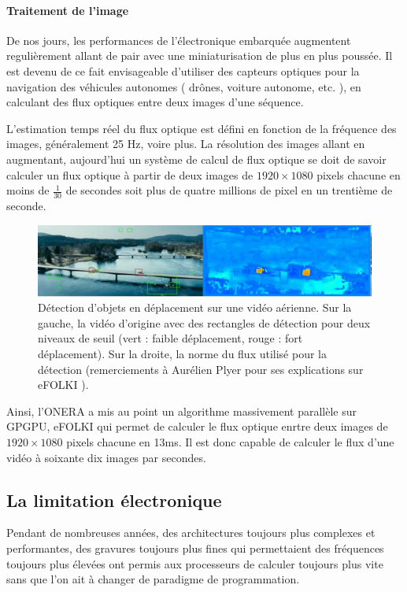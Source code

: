 \documentclass[fleqn,11pt]{article}
\begin{document}
\paragraph{Traitement de l'image}

De nos jours, les performances de l'électronique embarquée augmentent regulièrement allant de pair avec une miniaturisation de plus en plus poussée. Il est devenu de ce fait envisageable d'utiliser des capteurs optiques pour la navigation des véhicules autonomes  ( drônes, voiture autonome, etc. ), en calculant des flux optiques entre deux images d'une séquence. 

L'estimation temps réel du flux optique est défini en fonction de la fréquence des images, généralement 25 Hz, voire plus. La résolution des images allant en augmentant, aujourd'hui un système de calcul de flux optique se doit de savoir calculer un flux optique à partir de deux images de $1920\times 1080$ pixels chacune en moins de $\frac{1}{30}$ de secondes soit plus de quatre millions de pixel en un trentième de seconde.

\begin{figure}[h]
\includegraphics[width=\textwidth]{fluxvideo}
\caption{Détection d'objets en déplacement sur une vidéo aérienne. Sur la gauche, la vidéo d'origine avec des rectangles de détection pour deux niveaux de seuil (vert : faible déplacement, rouge : fort déplacement). Sur la droite, la norme du flux utilisé pour la détection (remerciements à Aurélien Plyer pour ses explications sur eFOLKI ).}
\end{figure}

Ainsi, l'ONERA a mis au point un algorithme massivement parallèle sur GPGPU, eFOLKI qui permet de calculer le flux optique enrtre deux images de $1920\times 1080$ pixels chacune en 13ms. Il est donc capable de calculer le flux d'une vidéo à soixante dix images par secondes.

\subsection{La limitation électronique}

Pendant de nombreuses années, des architectures toujours plus complexes et performantes, des gravures toujours plus fines qui permettaient des fréquences toujours plus élevées ont permis aux processeurs de calculer toujours plus vite sans que l'on ait à changer de paradigme de programmation.  
\end{document}
